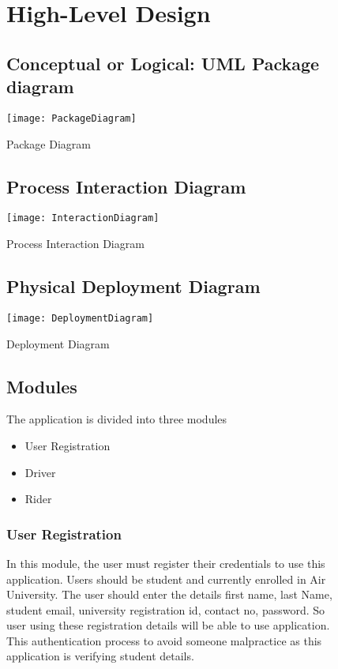 \begin{figure}
\section{High-Level Design}
\subsection{Conceptual or Logical: UML Package diagram} 
\center
\texttt{[image: PackageDiagram]}
\caption{Package Diagram}
\label{fig:Package Diagram}
\end{figure}

\begin{figure}
\subsection{Process Interaction Diagram}
\center
\texttt{[image: InteractionDiagram]}
\caption{Process Interaction Diagram}
\label{fig:Process Interaction Diagram}
\end{figure}

\begin{figure}
\subsection{Physical Deployment Diagram}
\center
\texttt{[image: DeploymentDiagram]}
\caption{Deployment Diagram}
\label{fig:Deployment Diagram}
\end{figure}

\begin{figure}
\subsection{Modules}
The application is divided into three modules
\begin{itemize}
\item User Registration
\item Driver
\item Rider
\end{itemize}
\end{figure}

\begin{figure}
\subsubsection{User Registration}
In this module, the user must register their credentials to use this application. Users should be student and currently enrolled in Air University. The user should enter the details first name, last Name, student email, university registration id, contact no, password. So user using these registration details will be able to use application. This authentication process to avoid someone malpractice as this application is verifying student details.
\end{figure}

